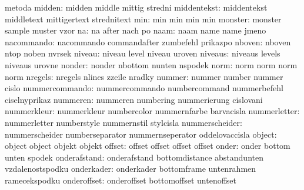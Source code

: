                        metoda
              midden:  midden               middle               mittig
                       stredni
         middentekst:  middentekst          middletext           mittigertext
                       strednitext
                 min:  min                  min                  min
                       min
             monster:  monster              sample               muster
                       vzor
                  na:  na                   after                nach
                       po
                naam:  naam                 name                 name
                       jmeno
          nacommando:  nacommando           commandafter         zumbefehl
                       prikazpo
              nboven:  nboven               ntop                 noben
                       nvrsek
              niveau:  niveau               level                niveau
                       uroven
             niveaus:  niveaus              levels               niveaus
                       urovne
              nonder:  nonder               nbottom              nunten
                       nspodek
                norm:  norm                 norm                 norm
                       norm
             nregels:  nregels              nlines               zzeile
                       nradky
              nummer:  nummer               number               nummer
                       cislo
      nummercommando:  nummercommando       numbercommand        nummerbefehl
                       ciselnyprikaz
            nummeren:  nummeren             numbering            nummerierung
                       cislovani
         nummerkleur:  nummerkleur          numbercolor          nummernfarbe
                       barvacisla
        nummerletter:  nummerletter         numberstyle          nummernstil
                       stylcisla
      nummerscheider:  nummerscheider       numberseparator      nummernseperator
                       oddelovaccisla
              object:  object               object               objekt
                       objekt
              offset:  offset               offset               offset
                       offset
               onder:  onder                bottom               unten
                       spodek
        onderafstand:  onderafstand         bottomdistance       abstandunten
                       vzdalenostspodku
          onderkader:  onderkader           bottomframe          untenrahmen
                       ramecekspodku
         onderoffset:  onderoffset          bottomoffset         untenoffset
